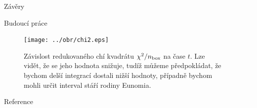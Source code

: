 \documentclass{beamer}
\newlength{\sep}
\newlength{\vyskaC}
\newlength{\side}
\begin{document}
\begin{frame}
\begin{columns}[t]
\begin{column}{\side}
\begin{block}{Závěry\phantom{Úy}}
\begin{minipage}[t][0.4\vyskaC][t]{\textwidth}
		\end{minipage}
	\end{block}
	\vspace{\sep}
	\begin{block}{Budoucí práce\phantom{Úy}}
		\begin{minipage}[t][0.3\vyskaC][t]{\textwidth}
		\begin{figure}
			\centering
			\texttt{[image: ../obr/chi2.eps]}
			\caption{Závislost redukovaného chí kvadrátu $\chi^2/n_{\rm box}$ na čase $t$. Lze vidět, že se jeho hodnota snižuje, tudíž můžeme předpokládat, že bychom delší integrací dostali nižší hodnoty, případně bychom mohli určit interval stáří rodiny Eunomia.} \label{fig:chi2}
		\end{figure}
		\end{minipage}
	\end{block}
	\vspace{\sep}
	\begin{block}{Reference\phantom{Úy}}

		\printbibliography
		\begin{minipage}[t][0.3\vyskaC][t]{\textwidth}
			{\tiny \printbibliography}
		\end{minipage}
	\end{block}
\end{column}


\begin{column}{\sep}
\end{column}

\end{columns}
\end{frame}
\end{document}
